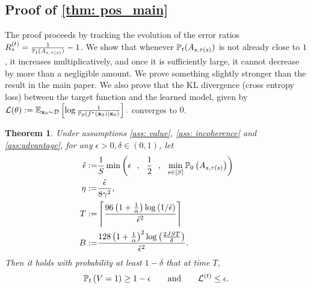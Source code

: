 \documentclass{article}
\theoremstyle{plain}
\newtheorem{theorem}{Theorem}[section]
\theoremstyle{definition}
\theoremstyle{remark}
\begin{document}
\subsection{Proof of \cref{thm: pos_main}}\label{app: main}
The proof proceeds by tracking the evolution of the error ratios
$R^{(t)}_s = \frac{1}{\P_t(A_{s,\tau(s)})}-1$.
We show that whenever $\P_t(A_{s,\tau(s)})$ is not already close to $1$, 
it increases multiplicatively, and once it is sufficiently large, it cannot decrease by more than a negligible amount. We prove something slightly stronger than the result in the main paper. We also prove that the KL divergence (cross entropy loss) between the target function and the learned model, given by $
    \Lcal(\theta) := \E_{\bx_0 \sim \Dcal}\left[\log \frac{1}{\P_\theta\left( f^*(\bx_0) \mid \bx_0 \right)}\right].
$ converges to $0$.
\begin{theorem}\label{thm: pos_full}
    Under assumptions \ref{ass: value}, \ref{ass: incoherence} and \cref{ass:advantage}, for any $\epsilon > 0, \delta \in (0,1)$, let
    \begin{align} 
        \tilde \epsilon :=& \frac{1}{S}\min\left(\epsilon ~~,~~ \frac{1}{2} ~~,~~ \min_{s \in [S]} \P_0\left(A_{s, \tau(s)}\right)\right) \\ 
        \eta := & \frac{\tilde \epsilon}{8 \gamma^2}, \\
        T := &\left \lceil \frac{96 \left(1 + \frac{1}{\alpha}\right)  \log\left(1 / \tilde \epsilon\right)}{\tilde \epsilon^2 } \right\rceil \\
        B :=&  \frac{128 \left(1+\frac{1}{\alpha}\right)^2  \log\left(\frac{2 J S T}{\delta}\right)}{\tilde \epsilon^2}.
    \end{align}
    Then it holds with probability at least $1-\delta$ that at time $T$, 
    \begin{align*}
        \P_t\left(V=1\right) \geq 1 - \epsilon \qquad \text{and} \qquad \Lcal^{(t)} \leq \epsilon.
    \end{align*}
\end{theorem}
\end{document}
